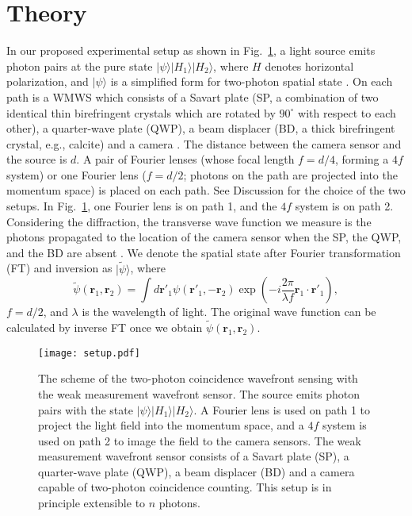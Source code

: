 \documentclass[pra,english,reprint,nofootinbib,aps,superscriptaddress,showpacs,showkeys]{revtex4-2}
\theoremstyle{definition}
\theoremstyle{remark}
\begin{document}
	\section{Theory}
	
	In our proposed experimental setup as shown in Fig.~\ref{figsetup}, a light source emits photon pairs at the pure state $|\psi\rangle|H_1\rangle|H_2\rangle$, where $H$ denotes horizontal polarization, and $|\psi\rangle$ is a simplified form for two-photon spatial state \cite{quanoptnote}. On each path is a WMWS which consists of a Savart plate (SP, a combination of two identical thin birefringent crystals which are rotated by $90^\circ$ with respect to each other), a quarter-wave plate (QWP), a beam displacer (BD, a thick birefringent crystal, e.g., calcite) and a camera \cite{Zheng2022}. The distance between the camera sensor and the source is $d$. A pair of Fourier lenses (whose focal length $f=d/4$, forming a $4f$ system) or one Fourier lens ($f=d/2$; photons on the path are projected into the momentum space) is placed on each path. See Discussion for the choice of the two setups. In Fig.~\ref{figsetup}, one Fourier lens is on path 1, and the $4f$ system is on path 2. Considering the diffraction, the transverse wave function we measure is the photons propagated to the location of the camera sensor when the SP, the QWP, and the BD are absent \cite{Kocsis2011,Zheng2021,Zhu2021}. We denote the spatial state after Fourier transformation (FT) and inversion as $|\tilde{\psi}\rangle$, where
	\begin{equation}\label{fourier1}
		\tilde{\psi}(\mathbf{r}_1,\mathbf{r}_2)=\int d\mathbf{r}'_1 \psi(\mathbf{r}'_1,-\mathbf{r}_2)\exp\left(-i\frac{2\pi}{\lambda f}\mathbf{r}_1\cdot\mathbf{r}'_1\right),
	\end{equation}
	$f=d/2$, and $\lambda$ is the wavelength of light. The original wave function can be calculated by inverse FT once we obtain $\tilde{\psi}(\mathbf{r}_1,\mathbf{r}_2)$.
	
	\begin{figure}[t]
		\centering
		\texttt{[image: setup.pdf]}
		\caption{The scheme of the two-photon coincidence wavefront sensing with the weak measurement wavefront sensor. The source emits photon pairs with the state $|\psi\rangle|H_1\rangle|H_2\rangle$. A Fourier lens is used on path 1 to project the light field into the momentum space, and a $4f$ system is used on path 2 to image the field to the camera sensors. The weak measurement wavefront sensor consists of a Savart plate (SP), a quarter-wave plate (QWP), a beam displacer (BD) and a camera capable of two-photon coincidence counting. This setup is in principle extensible to $n$ photons.
		}
		\label{figsetup}
	\end{figure}
	
\end{document}
